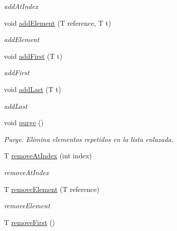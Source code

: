 \begin{DoxyCompactItemize}
\begin{DoxyCompactList}\small\item\em add\+At\+Index \end{DoxyCompactList}\item 
void \mbox{\hyperlink{class_estrcuturas_dinamicas_1_1_my_linked_list_aad1dd367db3ec4b27fb2d5700f8b243f}{add\+Element}} (T reference, T t)
\begin{DoxyCompactList}\small\item\em add\+Element \end{DoxyCompactList}\item 
void \mbox{\hyperlink{class_estrcuturas_dinamicas_1_1_my_linked_list_a5f18f6894c2e9f4cde007b8baebccd4c}{add\+First}} (T t)
\begin{DoxyCompactList}\small\item\em add\+First \end{DoxyCompactList}\item 
void \mbox{\hyperlink{class_estrcuturas_dinamicas_1_1_my_linked_list_a558415a72f956da042c701e65d5bd7a5}{add\+Last}} (T t)
\begin{DoxyCompactList}\small\item\em add\+Last \end{DoxyCompactList}\item 
void \mbox{\hyperlink{class_estrcuturas_dinamicas_1_1_my_linked_list_a7c05c0bb0d58e004735ff7c70a7b42f4}{purge}} ()
\begin{DoxyCompactList}\small\item\em Purge. Elimina elementos repetidos en la lista enlazada. \end{DoxyCompactList}\item 
T \mbox{\hyperlink{class_estrcuturas_dinamicas_1_1_my_linked_list_a00228f65c328c48481876460cec259d3}{remove\+At\+Index}} (int index)
\begin{DoxyCompactList}\small\item\em remove\+At\+Index \end{DoxyCompactList}\item 
T \mbox{\hyperlink{class_estrcuturas_dinamicas_1_1_my_linked_list_a8b5e8ba9e652934b8ccb5d27cad6b7b7}{remove\+Element}} (T reference)
\begin{DoxyCompactList}\small\item\em remove\+Element \end{DoxyCompactList}\item 
T \mbox{\hyperlink{class_estrcuturas_dinamicas_1_1_my_linked_list_aa3c087fb23faa5dff1f25efcd65521c6}{remove\+First}} ()

\end{DoxyCompactItemize}
